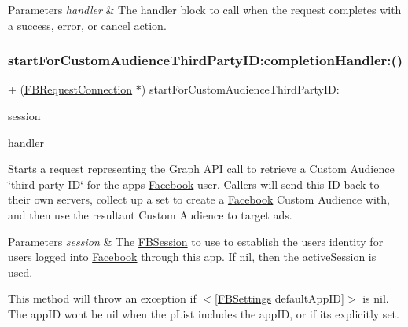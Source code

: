 \begin{DoxyParams}{Parameters}
{\em handler} & The handler block to call when the request completes with a success, error, or cancel action. \\
\hline
\end{DoxyParams}
\mbox{\label{interfaceFBRequestConnection_ab2ed1b7d417b4c723b37512870a5add9}} 
\subsubsection{\texorpdfstring{start\+For\+Custom\+Audience\+Third\+Party\+I\+D\+:completion\+Handler\+:()}{startForCustomAudienceThirdPartyID:completionHandler:()}\hspace{0.1cm}{\footnotesize\ttfamily [4/5]}}
{\footnotesize\ttfamily + (\hyperlink{interfaceFBRequestConnection}{F\+B\+Request\+Connection} $\ast$) start\+For\+Custom\+Audience\+Third\+Party\+I\+D\+: \begin{DoxyParamCaption}\item[{(\hyperlink{interfaceFBSession}{F\+B\+Session} $\ast$)}]{session }\item[{completionHandler:(F\+B\+Request\+Handler)}]{handler }\end{DoxyParamCaption}}

Starts a request representing the Graph A\+PI call to retrieve a Custom Audience \char`\"{}third party I\+D\char`\"{} for the app\textquotesingle{}s \hyperlink{interfaceFacebook}{Facebook} user. Callers will send this ID back to their own servers, collect up a set to create a \hyperlink{interfaceFacebook}{Facebook} Custom Audience with, and then use the resultant Custom Audience to target ads.


\begin{DoxyParams}{Parameters}
{\em session} & The \hyperlink{interfaceFBSession}{F\+B\+Session} to use to establish the user\textquotesingle{}s identity for users logged into \hyperlink{interfaceFacebook}{Facebook} through this app. If {\ttfamily nil}, then the active\+Session is used.\\
\hline
\end{DoxyParams}
This method will throw an exception if $<$\mbox{[}\hyperlink{interfaceFBSettings}{F\+B\+Settings} default\+App\+ID\mbox{]}$>$ is {\ttfamily nil}. The app\+ID won\textquotesingle{}t be nil when the p\+List includes the app\+ID, or if it\textquotesingle{}s explicitly set.

